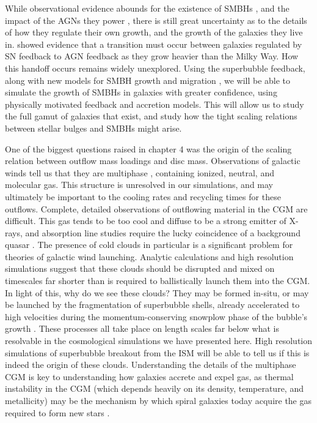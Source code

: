 While observational evidence abounds for the existence of SMBHs
\citep{Kormendy2013}, and the impact of the AGNs they power
\citep{Veilleux2005}, there is still great uncertainty as to the details of how
they regulate their own growth, and the growth of the galaxies they live in.
\citet{Keller2016a} showed evidence that a transition must occur between
galaxies regulated by SN feedback to AGN feedback as they grow heavier than the
Milky Way.  How this handoff occurs remains widely unexplored.  Using the
superbubble feedback, along with new models for SMBH growth \citep{Hopkins2010}
and migration \citep{Tremmel2015}, we will be able to simulate the growth of
SMBHs in galaxies with greater confidence, using physically motivated feedback
and accretion models.  This will allow us to study the full gamut of galaxies
that exist, and study how the tight scaling relations between stellar bulges and
SMBHs might arise.

One of the biggest questions raised in chapter 4 was the origin of the scaling
relation between outflow mass loadings and disc mass.  Observations of galactic
winds tell us that they are multiphase \citep{Stark1984,Wakker1997}, containing
ionized, neutral, and molecular gas.  This structure is unresolved in our
simulations, and may ultimately be important to the cooling rates and recycling
times for these outflows.  Complete, detailed observations of outflowing
material in the CGM are difficult. This gas tends to be too cool and diffuse to
be a strong emitter of X-rays, and absorption line studies require the lucky
coincidence of a background quasar \citep{Weiner2009}.  The presence of cold
clouds in particular is a significant problem for theories of galactic wind
launching.  Analytic calculations and high resolution simulations suggest that
these clouds should be disrupted and mixed on timescales far shorter than is
required to ballistically launch them into the CGM.  In light of this, why do we
see these clouds?  They may be formed in-situ, or may be launched by the
fragmentation of superbubble shells, already accelerated to high velocities
during the momentum-conserving snowplow phase of the bubble's growth
\citet{Lagos2013}.  These processes all take place on length scales far below
what is resolvable in the cosmological simulations we have presented here.  High
resolution simulations of superbubble breakout from the ISM will be able to tell
us if this is indeed the origin of these clouds.  Understanding the details of
the multiphase CGM is key to understanding how galaxies accrete and expel gas,
as thermal instability in the CGM (which depends heavily on its density,
temperature, and metallicity) may be the mechanism by which spiral galaxies
today acquire the gas required to form new stars \citep{Marasco2012}.  


